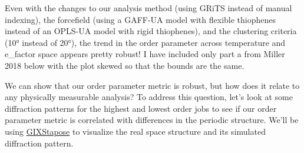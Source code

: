     Even with the changes to our analysis method (using GRiTS instead of
manual indexing), the forcefield (using a GAFF-UA model with flexible
thiophenes instead of an OPLS-UA model with rigid thiophenes), and the
clustering criteria (10° instead of 20°), the trend in the order
parameter across temperature and e\_factor space appears pretty robust!
I have included only part a from Miller 2018 below with the plot skewed
so that the bounds are the same.

    \begin{center}
    \end{center}

We can show that our order parameter metric is robust, but how does it
relate to any physically measurable analysis? To address this question,
let's look at some diffraction patterns for the highest and lowest order
jobs to see if our order parameter metric is correlated with differences
in the periodic structure. We'll be using
\href{https://github.com/cmelab/GIXStapose}{GIXStapose} to visualize the
real space structure and its simulated diffraction pattern.

